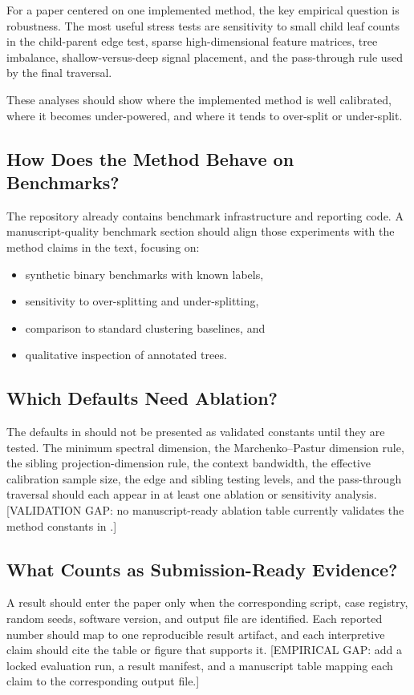 For a paper centered on one implemented method, the key empirical question is
robustness. The most useful stress tests are sensitivity to small child leaf
counts in the child-parent edge test, sparse high-dimensional feature matrices,
tree imbalance, shallow-versus-deep signal placement, and the pass-through rule
used by the final traversal.

These analyses should show where the implemented method is well calibrated,
where it becomes under-powered, and where it tends to over-split or
under-split.

\subsection{How Does the Method Behave on Benchmarks?}

The repository already contains benchmark infrastructure and reporting code. A
manuscript-quality benchmark section should align those experiments with the
method claims in the text, focusing on:

\begin{itemize}[leftmargin=1.5em]
  \item synthetic binary benchmarks with known labels,
  \item sensitivity to over-splitting and under-splitting,
  \item comparison to standard clustering baselines, and
  \item qualitative inspection of annotated trees.
\end{itemize}

\subsection{Which Defaults Need Ablation?}

The defaults in  should not be presented as
validated constants until they are tested. The minimum spectral dimension, the
Marchenko--Pastur dimension rule, the sibling projection-dimension rule, the
context bandwidth, the effective calibration sample size, the edge and sibling
testing levels, and the pass-through traversal should each appear in at least
one ablation or sensitivity analysis.
[VALIDATION GAP: no manuscript-ready ablation table currently validates the
method constants in .]

\subsection{What Counts as Submission-Ready Evidence?}

A result should enter the paper only when the corresponding script, case
registry, random seeds, software version, and output file are identified. Each
reported number should map to one reproducible result artifact, and each
interpretive claim should cite the table or figure that supports it.
[EMPIRICAL GAP: add a locked evaluation run, a result manifest, and a
manuscript table mapping each claim to the corresponding output file.]
